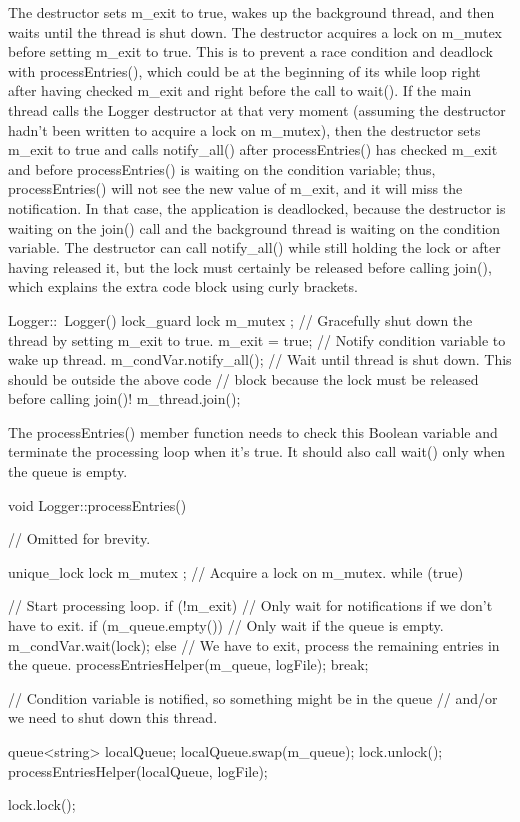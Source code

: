 The destructor sets m\_exit to true, wakes up the background thread, and then waits until the thread is shut down. The destructor acquires a lock on m\_mutex before setting m\_exit to true. This is to prevent a race condition and deadlock with processEntries(), which could be at the beginning of its while loop right after having checked m\_exit and right before the call to wait(). If the main thread calls the Logger destructor at that very moment (assuming the destructor hadn’t been written to acquire a lock on m\_mutex), then the destructor sets m\_exit to true and calls notify\_all() after processEntries() has checked m\_exit and before processEntries() is waiting on the condition variable; thus, processEntries() will not see the new value of m\_exit, and it will miss the notification. In that case, the application is deadlocked, because the destructor is waiting on the join() call and the background thread is waiting on the condition variable. The destructor can call notify\_all() while still holding the lock or after having released it, but the lock must certainly be released before calling join(), which explains the extra code block using curly brackets.

\begin{cpp}
Logger::~Logger()
{
    {
        lock_guard lock { m_mutex };
        // Gracefully shut down the thread by setting m_exit to true.
        m_exit = true;
    }
    // Notify condition variable to wake up thread.
    m_condVar.notify_all();
    // Wait until thread is shut down. This should be outside the above code
    // block because the lock must be released before calling join()!
    m_thread.join();
}
\end{cpp}

The processEntries() member function needs to check this Boolean variable and terminate the processing loop when it’s true. It should also call wait() only when the queue is empty.

\begin{cpp}
void Logger::processEntries()
{
    // Omitted for brevity.

    unique_lock lock { m_mutex }; // Acquire a lock on m_mutex.
    while (true) { // Start processing loop.
        if (!m_exit) { // Only wait for notifications if we don't have to exit.
            if (m_queue.empty()) { // Only wait if the queue is empty.
                m_condVar.wait(lock);
            }
        } else {
            // We have to exit, process the remaining entries in the queue.
            processEntriesHelper(m_queue, logFile);
            break;
        }

        // Condition variable is notified, so something might be in the queue
        // and/or we need to shut down this thread.

        queue<string> localQueue;
        localQueue.swap(m_queue);
        lock.unlock();
        processEntriesHelper(localQueue, logFile);

        lock.lock();
    }
}
\end{cpp}


